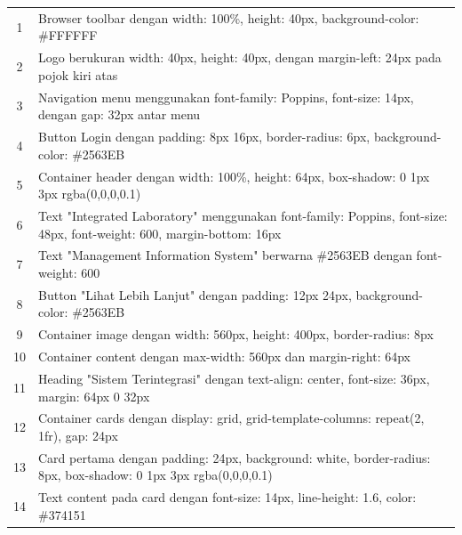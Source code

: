 \begin{enumerate}
\begin{longtable}{c p{}}
		      1                       & Browser toolbar dengan width: 100\%, height: 40px, background-color: \#FFFFFF                                         \\
		      2                       & Logo berukuran width: 40px, height: 40px, dengan margin-left: 24px pada pojok kiri atas                               \\
		      3                       & Navigation menu menggunakan font-family: Poppins, font-size: 14px, dengan gap: 32px antar menu                        \\
		      4                       & Button Login dengan padding: 8px 16px, border-radius: 6px, background-color: \#2563EB                                 \\
		      5                       & Container header dengan width: 100\%, height: 64px, box-shadow: 0 1px 3px rgba(0,0,0,0.1)                             \\
		      6                       & Text "Integrated Laboratory" menggunakan font-family: Poppins, font-size: 48px, font-weight: 600, margin-bottom: 16px \\
		      7                       & Text "Management Information System" berwarna \#2563EB dengan font-weight: 600                                        \\
		      8                       & Button "Lihat Lebih Lanjut" dengan padding: 12px 24px, background-color: \#2563EB                                     \\
		      9                       & Container image dengan width: 560px, height: 400px, border-radius: 8px                                                \\
		      10                      & Container content dengan max-width: 560px dan margin-right: 64px                                                      \\
		      11                      & Heading "Sistem Terintegrasi" dengan text-align: center, font-size: 36px, margin: 64px 0 32px                         \\
		      12                      & Container cards dengan display: grid, grid-template-columns: repeat(2, 1fr), gap: 24px                                \\
		      13                      & Card pertama dengan padding: 24px, background: white, border-radius: 8px, box-shadow: 0 1px 3px rgba(0,0,0,0.1)       \\
		      14                      & Text content pada card dengan font-size: 14px, line-height: 1.6, color: \#374151                                      \\

\end{longtable}
\end{enumerate}
